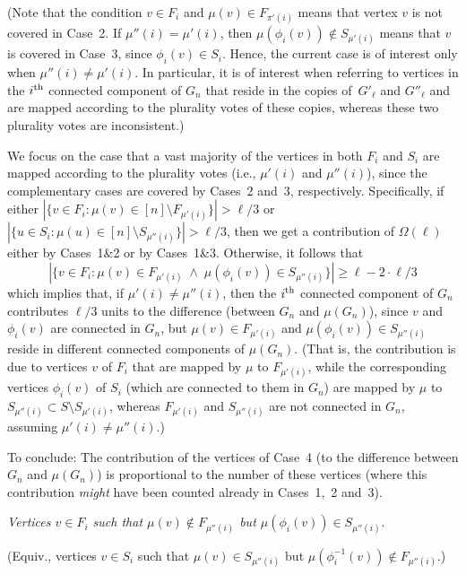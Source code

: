 \documentclass[10pt,a4paper]{article}
\theoremstyle{definition}
\newcommand{\xth}{{\rm th}}
\newcommand{\si}{\mu}
\begin{document}
(Note that the condition $v\in F_i$ and $\mu(v)\in F_{\pi'(i)}$
means that vertex $v$ is not covered in Case~2.
If $\si''(i)=\si'(i)$, then $\mu(\phi_i(v))\not\in S_{\si'(i)}$
means that $v$ is covered in Case~3, since $\phi_i(v)\in S_{i}$.
Hence, the current case is of interest only when $\si''(i)\neq\si'(i)$.
In particular, it is of interest when referring to vertices
in the $i^\xth$ connected component of $G_n$ that reside
in the copies of~$G'_\ell$ and $G''_\ell$ and are mapped
according to the plurality votes of these copies,
whereas these two plurality votes are inconsistent.)

We focus on the case that a vast majority of the vertices in
both $F_i$ and $S_i$ are mapped according to the plurality votes
(i.e., $\si'(i)$ and $\si''(i)$), since the complementary cases
are covered by Cases~2 and~3, respectively.
Specifically, if
either $|\{v\!\in\!F_i\!:\!\mu(v)\!\in\![n]\setminus F_{\si'(i)}\}|>\ell/3$
or $|\{u\!\in\!S_i\!:\!\mu(u)\!\in\![n]\setminus S_{\si''(i)}\}|>\ell/3$,
then we get a contribution of $\Omega(\ell)$
either by Cases~1\&2 or by Cases~1\&3.
%
Otherwise, it follows that
$${|\{v\!\in\!F_i\!:\!\mu(v)\!\in\!F_{\si'(i)}
    \;\wedge\; \mu(\phi_i(v))\!\in\!S_{\si''(i)}\}|}
    \geq \ell -2\cdot\ell/3$$
which implies that, if $\si'(i)\neq\si''(i)$,
then the $i^\xth$ connected component of $G_n$
contributes $\ell/3$ units to the difference
(between $G_n$ and $\mu(G_n)$),
since $v$ and $\phi_i(v)$ are connected in $G_n$,
but $\mu(v)\in F_{\si'(i)}$ and $\mu(\phi_i(v))\in S_{\si''(i)}$
reside in different connected components of $\mu(G_n)$.
(That is, the contribution is due to vertices $v$ of $F_i$
that are mapped by $\mu$ to $F_{\si'(i)}$,
while the corresponding vertices $\phi_i(v)$ of $S_i$
(which are connected to them in $G_n$) are mapped by $\mu$
to $S_{\si''(i)}\subset S\setminus S_{\si'(i)}$,
whereas $F_{\si'(i)}$ and $S_{\si''(i)}$ are not connected in $G_n$,
assuming $\si'(i)\neq\si''(i)$.)
%
%
%
%


To conclude: The contribution of the vertices of Case~4
(to the difference between $G_n$ and $\mu(G_n)$)
is proportional to the number of these vertices
(where this contribution {\em might}\/ have been counted
already in Cases~1,~2 and~3).

\item[{\em Case 5}:]
{\em Vertices $v\in F_i$ such that $\mu(v)\not\in F_{\si''(i)}$
but $\mu(\phi_i(v))\in S_{\si''(i)}$}.
%
%
%

(Equiv., vertices $v\in S_i$ such that $\mu(v)\in S_{\si''(i)}$
but $\mu(\phi_i^{-1}(v))\not\in F_{\si''(i)}$.)
\end{document}
